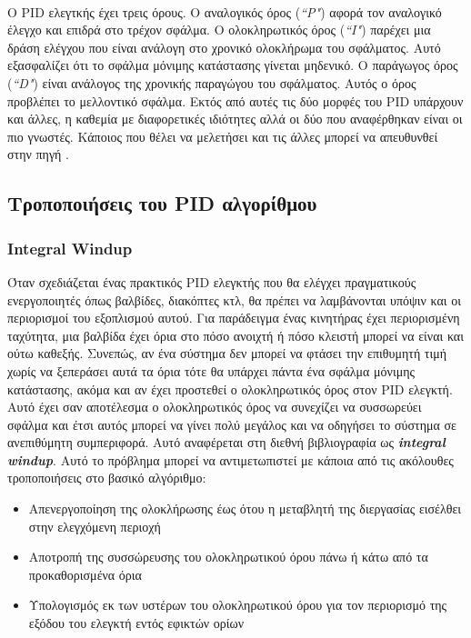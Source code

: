 \paragraph{}
Ο PID ελεγτκής έχει τρεις όρους. Ο αναλογικός όρος (\emph{``P"}) αφορά τον αναλογικό έλεγχο και επιδρά στο τρέχον σφάλμα. Ο ολοκληρωτικός όρος (\emph{``I"}) παρέχει μια δράση ελέγχου που είναι ανάλογη στο χρονικό ολοκλήρωμα του σφάλματος. Αυτό εξασφαλίζει ότι το σφάλμα μόνιμης κατάστασης γίνεται μηδενικό. Ο παράγωγος όρος (\emph{``D"}) είναι ανάλογος της χρονικής παραγώγου του σφάλματος. Αυτός ο όρος προβλέπει το μελλοντικό σφάλμα. Εκτός από αυτές τις δύο μορφές του PID υπάρχουν και άλλες, η καθεμία με διαφορετικές ιδιότητες αλλά οι δύο που αναφέρθηκαν είναι οι πιο γνωστές. Κάποιος που θέλει να μελετήσει και τις άλλες μπορεί να απευθυνθεί στην πηγή \cite{astrom}.

\subsection{Τροποποιήσεις του PID αλγορίθμου}

\subsubsection{Integral Windup}
Όταν σχεδιάζεται ένας πρακτικός PID ελεγκτής που θα ελέγχει πραγματικούς ενεργοποιητές όπως βαλβίδες, διακόπτες κτλ, θα πρέπει να λαμβάνονται υπόψιν και οι περιορισμοί του εξοπλισμού αυτού. Για παράδειγμα ένας κινητήρας έχει περιορισμένη ταχύτητα, μια βαλβίδα έχει όρια στο πόσο ανοιχτή ή πόσο κλειστή μπορεί να είναι και ούτω καθεξής. Συνεπώς, αν ένα σύστημα δεν μπορεί να φτάσει την επιθυμητή τιμή χωρίς να ξεπεράσει αυτά τα όρια τότε θα υπάρχει πάντα ένα σφάλμα μόνιμης κατάστασης, ακόμα και αν έχει προστεθεί ο ολοκληρωτικός όρος στον PID ελεγκτή. Αυτό έχει σαν αποτέλεσμα ο ολοκληρωτικός όρος να συνεχίζει να συσσωρεύει σφάλμα και έτσι αυτός μπορεί να γίνει πολύ μεγάλος και να οδηγήσει το σύστημα σε ανεπιθύμητη συμπεριφορά. Αυτό αναφέρεται στη διεθνή βιβλιογραφία ως \textbf{\emph{integral windup}}. Αυτό το πρόβλημα μπορεί να αντιμετωπιστεί με κάποια από τις ακόλουθες τροποποιήσεις στο βασικό αλγόριθμο:
\begin{itemize}
\item Απενεργοποίηση της ολοκλήρωσης έως ότου η μεταβλητή της διεργασίας εισέλθει στην ελεγχόμενη περιοχή
\item Αποτροπή της συσσώρευσης του ολοκληρωτικού όρου πάνω ή κάτω από τα προκαθορισμένα όρια
\item Υπολογισμός εκ των υστέρων του ολοκληρωτικού όρου για τον περιορισμό της εξόδου του ελεγκτή εντός εφικτών ορίων
\end{itemize}

